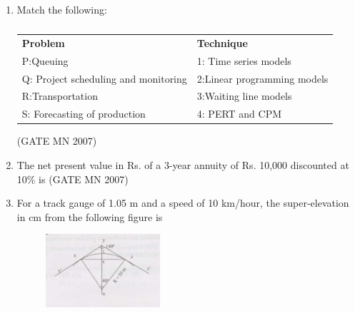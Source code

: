 \documentclass[journal]{IEEEtran}
\begin{document}
\begin{enumerate}
\item Match the following:\\
	\begin{table}[H]
    \centering\normalsize
\begin{tabular}{p{4.5cm} p{6cm}}                
\textbf{Problem} & \textbf{Technique}      \\                                              
P:Queuing & 1: Time series models \\            
Q: Project scheduling and monitoring & 2:Linear programming models \\  
R:Transportation & 3:Waiting line models \\     
S: Forecasting of production & 4: PERT and CPM \\
\end{tabular}
    \caption*{}
    \label{tab:Q63}
\end{table}
	
\hfill (GATE MN 2007)
\begin{enumerate}
\end{enumerate}


\item The net present value in Rs. of a 3-year annuity of Rs. 10,000 discounted at 10\% is  
	\hfill (GATE MN 2007)
\begin{enumerate}
\end{enumerate}


\item For a track gauge of 1.05 m and a speed of 10 km/hour, the super-elevation in cm from the following figure is
	\begin{figure}[H]
    \centering
	\includegraphics[width=0.4\textwidth]{Screenshot_2025_0812_180648.png}
	\caption*{}
    \label{fig:Q65}
\end{figure}


\end{enumerate}
\end{document}
